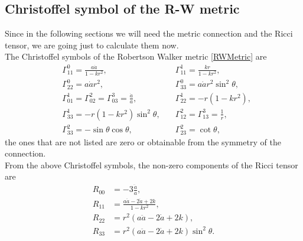 \subsection{Christoffel symbol of the R-W metric}
Since in the following sections we will need the metric connection and the Ricci tensor, we are going just to calculate them now.\\
The Christoffel symbols of the Robertson Walker metric \eqref{RWMetric} are
\begin{align}
    &\Gamma^0_{11}=\frac{a\dot{a}}{1-kr^2}, \quad&\Gamma^1_{11}=\frac{kr}{1-kr^2},\nonumber\\&\Gamma^0_{22}=a\dot{a}r^2, \quad&\Gamma^0_{33}=a\dot{a}r^2\sin^2\theta,\nonumber\\&\Gamma^1_{01}=\Gamma^2_{02}=\Gamma^3_{03}=\frac{\dot{a}}{a}, \quad &\Gamma^1_{22}=-r(1-kr^2),\nonumber\\&\Gamma^1_{33}=-r(1-kr^2)\sin^2\theta, \quad &\Gamma^2_{12}=\Gamma^3_{13}=\frac{1}{r},\nonumber\\&\Gamma^2_{33}=-\sin\theta\cos\theta, \quad &\Gamma^2_{23}=\cot\theta,\label{RWChristoffel}
\end{align}
the ones that are not listed are zero or obtainable from the symmetry of the connection.\\
From the above Christoffel symbols, the non-zero components of the Ricci tensor are
\begin{align}
    R_{00}&=-3\frac{\ddot a}{a},\nonumber\\
    R_{11}&=\frac{a\ddot{a}-2\dot a+2k}{1-kr^2},\nonumber\\
    R_{22}&=r^2(a\ddot{a}-2\dot a+2k),\nonumber\\
    R_{33}&=r^2(a\ddot{a}-2\dot a+2k)\sin^2\theta.\label{RWRicci}
\end{align}